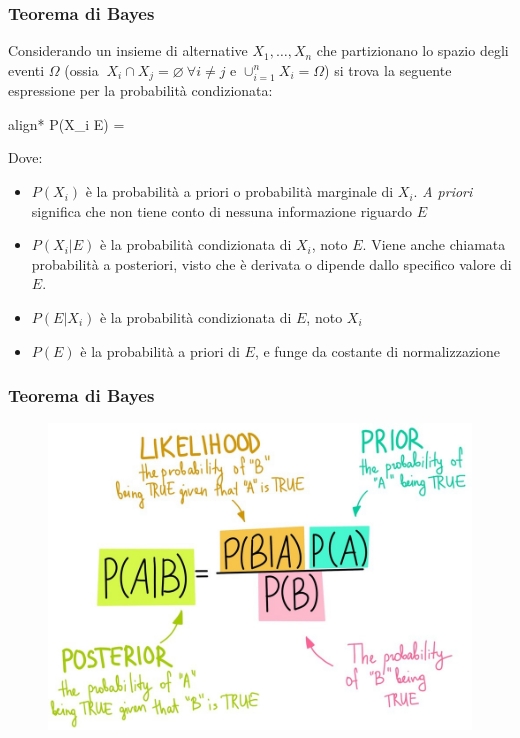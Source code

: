 \begin{frame}
	
	\frametitle{Teorema di Bayes}
			Considerando un insieme di alternative $X_1,\ldots,X_n$ che partizionano lo spazio degli eventi $\Omega$ (ossia $\ X_i\cap X_j=\varnothing\ \forall i \neq j$ e $\cup_{i=1}^n X_i=\Omega$) si trova la seguente espressione per la probabilità condizionata:
				\begin{empheq}[box=\fcolorbox{blue!40!black!60}{yellow!10}]{align*}
					P(X_i \vert E) = \frac{P(E \vert X_i) P(X_i)}{P(E)}
				\end{empheq}

		Dove:
		\begin{itemize}
			\item $P(X_i)$ è la probabilità a priori o probabilità marginale di $X_i$. \textit{A priori} significa che non tiene conto di nessuna informazione riguardo $E$
			\item $P(X_i \vert E)$ è la probabilità condizionata di $X_i$, noto $E$. Viene anche chiamata probabilità a posteriori, visto che è derivata o dipende dallo specifico valore di $E$.
			\item $P(E \vert X_i)$ è la probabilità condizionata di $E$, noto $X_i$
			\item $P(E)$ è la probabilità a priori di $E$, e funge da costante di normalizzazione
		
		\end{itemize}

	
\end{frame}


\begin{frame}
	
	\frametitle{Teorema di Bayes}
		
	\begin{figure}[!htbp]
		\centering
		\includegraphics[width=0.8\linewidth]{images/supervised/naive_bayes/bayes_rule.jpeg}
	\end{figure}
	
\end{frame}


